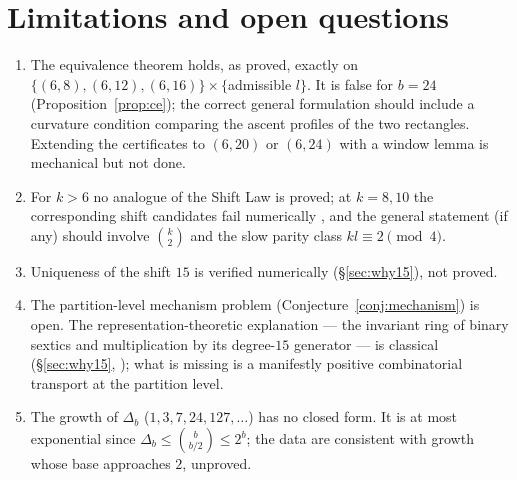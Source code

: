 \documentclass[11pt,reqno]{article}
\theoremstyle{definition}
\begin{document}
\section{Limitations and open questions}\label{sec:limits}
\begin{enumerate}
\item The equivalence theorem holds, as proved, exactly on $\{(6,8),(6,12),(6,16)\}\times\{$admissible $l\}$. It is false for $b=24$ (Proposition~\ref{prop:ce}); the correct general formulation should include a curvature condition comparing the ascent profiles of the two rectangles. Extending the certificates to $(6,20)$ or $(6,24)$ with a window lemma is mechanical but not done.
\item For $k>6$ no analogue of the Shift Law is proved; at $k=8,10$ the corresponding shift candidates fail numerically \cite{M08}, and the general statement (if any) should involve $\binom k2$ and the slow parity class $kl\equiv2\pmod4$.
\item Uniqueness of the shift $15$ is verified numerically (\S\ref{sec:why15}), not proved.
\item The partition-level mechanism problem (Conjecture~\ref{conj:mechanism}) is open. The representation-theoretic explanation --- the invariant ring of binary sextics and multiplication by its degree-$15$ generator --- is classical (\S\ref{sec:why15}, \cite{GY,KKM}); what is missing is a manifestly positive combinatorial transport at the partition level.
\item The growth of $\Delta_b$ ($1,3,7,24,127,\dots$) has no closed form. It is at most exponential since $\Delta_b\le\binom{b}{b/2}\le 2^b$; the data are consistent with growth whose base approaches $2$, unproved.
\end{enumerate}
\end{document}
